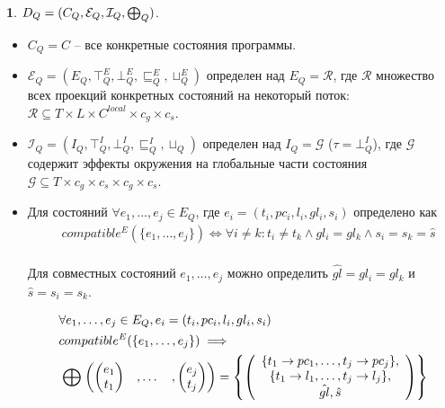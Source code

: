 {\textbf 1.} 
$D_Q=(C_Q, \mathcal{E}_Q,\mathcal{I}_Q, \mathrel{\bigoplus}_Q)$.\\

\begin{itemize}
\item $C_Q=C$ -- все конкретные состояния программы.\\

\item $\mathcal{E}_Q=(E_Q, \top^E_Q, \bot^E_Q, \sqsubseteq^E_Q, \sqcup^E_Q)$ определен над $E_Q=\mathcal{R}$, где
$\mathcal{R}$ множество всех проекций конкретных состояний на некоторый поток:
$\mathcal{R} \subseteq T\times L\times C^{local} \times c_g \times c_s$.

\item $\mathcal{I}_Q=(I_Q, \top^I_Q, \bot^I_Q, \sqsubseteq^I_Q, \sqcup_Q)$ определен над $I_Q=\mathcal{G}$ ($\tau=\bot^I_Q$), где
$\mathcal{G}$ содержит эффекты окружения на глобальные части состояния
$\mathcal{G} \subseteq T\times c_g \times c_s \times c_g \times c_s$.

\item Для состояний $\forall e_1, \dots, e_j \in E_Q$, где $e_i=(t_i,pc_i,l_i,gl_i,s_i)$ определено как
\begin{equation}
\label{compatible_tm_na}
\begin{aligned}
& compatible^E(\{e_1, \dots, e_j\}) \Leftrightarrow \forall i\ne k:t_i\ne t_k \land gl_i=gl_k \land s_i=s_k=\hat s\\
\end{aligned}
\end{equation}

Для совместных состояний $e_1,\dots,e_j$ можно определить $\hat{gl}=gl_i=gl_k$ и $\hat s=s_i=s_k$.

\begin{equation}
\label{epp_tm_na}
\begin{aligned}
& \forall e_1, \dots, e_j \in E_Q, e_i=(t_i,pc_i,l_i,gl_i,s_i)\\
& compatible^E(\{e_1,\dots,e_j\}) \implies \\
& \mathrel{\bigoplus}
\begin{pmatrix}
\begin{pmatrix}
e_1 \\
t_1 
\end{pmatrix}& ,
\dots& ,
\begin{pmatrix}
e_j \\
t_j 
\end{pmatrix}
\end{pmatrix} = 
\left\lbrace\left(
\begin{array}{c}
\{t_1 \to pc_1,\dots,t_j \to pc_j\},\\
\{t_1\to l_1, \dots, t_j\to l_j\},\\
\hat{gl}, \hat s
\end{array}
\right)\right\rbrace
\\
\end{aligned}
\end{equation}


\end{itemize}
